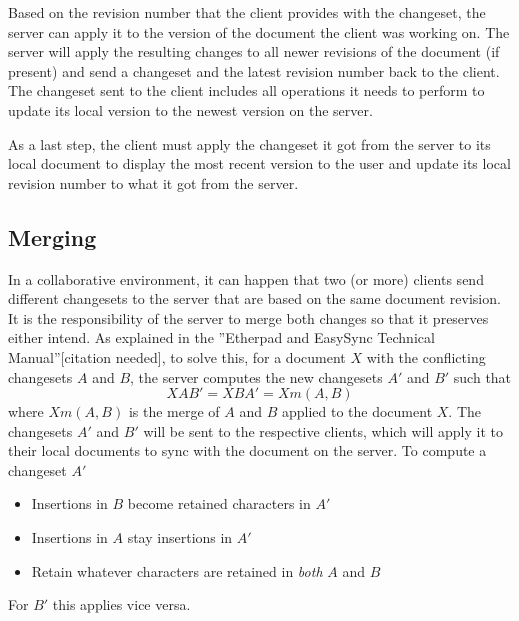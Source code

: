 Based on the revision number that the client provides with the changeset, the server can apply it to the version of the document the client was working on. The server will apply the resulting changes to all newer revisions of the document (if present) and send a changeset and the latest revision number back to the client. The changeset sent to the client includes all operations it needs to perform to update its local version to the newest version on the server.


As a last step, the client must apply the changeset it got from the server to its local document to display the most recent version to the user and update its local revision number to what it got from the server.

\subsection{Merging}

In a collaborative environment, it can happen that two (or more) clients send different changesets to the server that are based on the same document revision. It is the responsibility of the server to merge both changes so that it preserves either intend. As explained in the ''Etherpad and EasySync Technical Manual''[citation needed], to solve this, for a document $X$ with the conflicting changesets $A$ and $B$, the server computes the new changesets $A'$ and $B'$ such that
$$XAB' = XBA' = Xm(A,B)$$
where $Xm(A,B)$ is the merge of $A$ and $B$ applied to the document $X$. The changesets $A'$ and $B'$ will be sent to the respective clients, which will apply it to their local documents to sync with the document on the server. To compute a changeset $A'$

\begin{itemize}
\item Insertions in $B$ become retained characters in $A'$
\item Insertions in $A$ stay insertions in $A'$
\item Retain whatever characters are retained in \emph{both} $A$ and $B$
\end{itemize}

For $B'$ this applies vice versa. %

